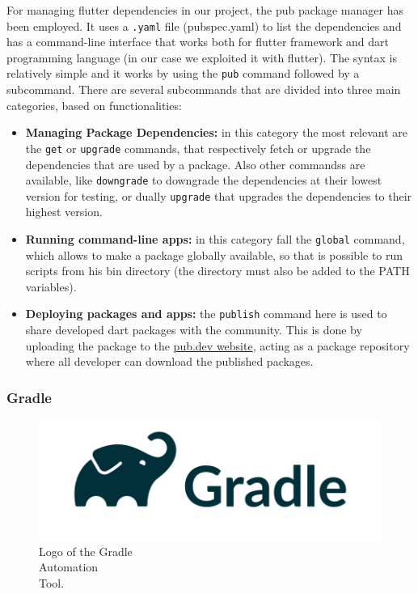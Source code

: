 For managing flutter dependencies in our project, the pub package manager has been employed. It uses a \texttt{.yaml} file (pubspec.yaml) to list the dependencies and has a command-line interface that works both for flutter framework and dart programming language (in our case we exploited it with flutter). The syntax is relatively simple and it works by using the \texttt{pub} command followed by a subcommand. \newline There are several subcommands that are divided into three main categories, based on functionalities\cite{Pub}:
\vspace{3ex}
\begin{itemize}[nosep]
    \item \textbf{Managing Package Dependencies:} in this category the most relevant are the \texttt{get} or \texttt{upgrade} commands, that respectively fetch or upgrade the dependencies that are used by a package. Also other commandss are available, like \texttt{downgrade} to downgrade the dependencies at their lowest version for testing, or dually \texttt{upgrade} that upgrades the dependencies to their highest version. 
    \item \textbf{Running command-line apps:} in this category fall the \texttt{global} command, which allows to make a package globally available, so that is possible to run scripts from his bin directory (the directory must also be added to the PATH variables).
    \item \textbf{Deploying packages and apps:} the \texttt{publish} command here is used to share developed dart packages with the community. This is done by uploading the package to the \href{https://pub.dev/}{pub.dev website}, acting as a package repository where all developer can download the published packages. 
\end{itemize}

\newpage
\subsubsection{Gradle}
\label{subsubsec:gradle}

\begin{figure} %
    \captionsetup{font=footnotesize}
    \centering
    \includegraphics[width=\linewidth]{images/gradle.png}
    \caption{Logo of the Gradle\\Automation\\Tool.}
\end{figure}

